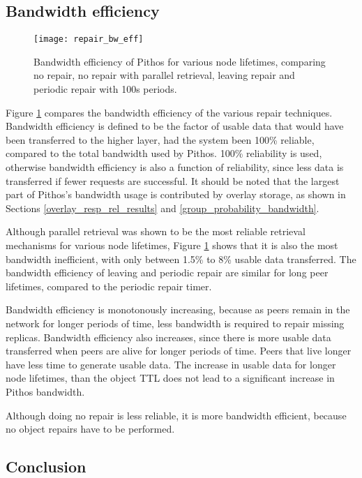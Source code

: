 \subsection{Bandwidth efficiency}

\begin{figure}[htbp]
 \centering
 \texttt{[image: repair\_bw\_eff]}
 \caption{Bandwidth efficiency of Pithos for various node lifetimes, comparing no repair, no repair with parallel retrieval, leaving repair and periodic repair with 100s periods.}
 \label{fig_repair_bw_eff}
\end{figure}
%
Figure \ref{fig_repair_bw_eff} compares the bandwidth efficiency of the various repair techniques. Bandwidth efficiency is defined to be the factor of usable data that would have been transferred to the higher layer, had the system been 100\% reliable, compared to the total bandwidth used by Pithos. 100\% reliability is used, otherwise bandwidth efficiency is also a function of reliability, since less data is transferred if fewer requests are successful. It should be noted that the largest part of Pithos's bandwidth usage is contributed by overlay storage, as shown in Sections \ref{overlay_resp_rel_results} and \ref{group_probability_bandwidth}.

Although parallel retrieval was shown to be the most reliable retrieval mechanisms for various node lifetimes, Figure \ref{fig_repair_bw_eff} shows that it is also the most bandwidth inefficient, with only between 1.5\% to 8\% usable data transferred. The bandwidth efficiency of leaving and periodic repair are similar for long peer lifetimes, compared to the periodic repair timer.

Bandwidth efficiency is monotonously increasing, because as peers remain in the network for longer periods of time, less bandwidth is required to repair missing replicas. Bandwidth efficiency also increases, since there is more usable data transferred when peers are alive for longer periods of time. Peers that live longer have less time to generate usable data. The increase in usable data for longer node lifetimes, than the object TTL does not lead to a significant increase in Pithos bandwidth.

Although doing no repair is less reliable, it is more bandwidth efficient, because no object repairs have to be performed.

\subsection{Conclusion}

